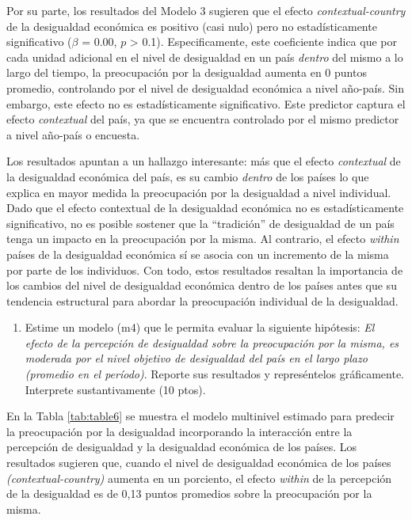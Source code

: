 \documentclass[
  12pt,
  a4paper,
]{article}
\providecommand{\tightlist}{%
  \setlength{\itemsep}{0pt}\setlength{\parskip}{0pt}}
\begin{document}
Por su parte, los resultados del Modelo 3 sugieren que el efecto \emph{contextual-country} de la desigualdad económica es positivo (casi nulo) pero no estadísticamente significativo (\(\beta\) = 0.00, \(p\) \textgreater{} 0.1). Especificamente, este coeficiente indica que por cada unidad adicional en el nivel de desigualdad en un país \emph{dentro} del mismo a lo largo del tiempo, la preocupación por la desigualdad aumenta en 0 puntos promedio, controlando por el nivel de desigualdad económica a nivel año-país. Sin embargo, este efecto no es estadísticamente significativo. Este predictor captura el efecto \emph{contextual} del país, ya que se encuentra controlado por el mismo predictor a nivel año-país o encuesta.

Los resultados apuntan a un hallazgo interesante: más que el efecto \emph{contextual} de la desigualdad económica del país, es su cambio \emph{dentro} de los países lo que explica en mayor medida la preocupación por la desigualdad a nivel individual. Dado que el efecto contextual de la desigualdad económica no es estadísticamente significativo, no es posible sostener que la ``tradición'' de desigualdad de un país tenga un impacto en la preocupación por la misma. Al contrario, el efecto \emph{within} países de la desigualdad económica sí se asocia con un incremento de la misma por parte de los individuos. Con todo, estos resultados resaltan la importancia de los cambios del nivel de desigualdad económica dentro de los países antes que su tendencia estructural para abordar la preocupación individual de la desigualdad.

\begin{enumerate}
\def\labelenumi{\alph{enumi})}
\setcounter{enumi}{2}
\tightlist
\item
  Estime un modelo (m4) que le permita evaluar la siguiente hipótesis: \emph{El efecto de la percepción de desigualdad sobre la preocupación por la misma, es moderada por el nivel objetivo de desigualdad del país en el largo plazo (promedio en el período)}. Reporte sus resultados y represéntelos gráficamente. Interprete sustantivamente (10 ptos).
\end{enumerate}

En la Tabla \ref{tab:table6} se muestra el modelo multinivel estimado para predecir la preocupación por la desigualdad incorporando la interacción entre la percepción de desigualdad y la desigualdad económica de los países. Los resultados sugieren que, cuando el nivel de desigualdad económica de los países \emph{(contextual-country)} aumenta en un porciento, el efecto \emph{within} de la percepción de la desigualdad es de 0,13 puntos promedios sobre la preocupación por la misma.
\end{document}

